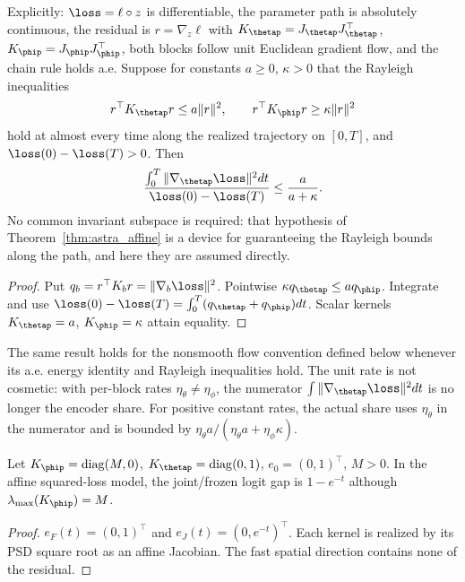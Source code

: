 \begin{corollary}
\label{cor:astra_attribution}
Explicitly: $\loss=\ell\circ z$ is differentiable, the parameter path
is absolutely continuous, the residual is $r=\nabla_z\ell$ with
$K_\thetap=J_\thetap J_\thetap^\top$,
$K_\phip=J_\phip J_\phip^\top$, both blocks follow unit Euclidean
gradient flow, and the chain rule holds a.e. Suppose for constants
$a\ge0$, $\kappa>0$ that the Rayleigh inequalities
\[
 r^\top K_\thetap r\le a\|r\|^2,\qquad
 r^\top K_\phip r\ge\kappa\|r\|^2
\]
hold at almost every time along the realized trajectory on $[0,T]$,
and $\loss(0)-\loss(T)>0$. Then
\begin{equation}\label{eq:astra_attribution}
 \frac{\int_0^T\|\nabla_\thetap\loss\|^2dt}{\loss(0)-\loss(T)}
 \le\frac{a}{a+\kappa}.
\end{equation}
No common invariant subspace is required: that hypothesis of
Theorem~\ref{thm:astra_affine} is a device for guaranteeing the
Rayleigh bounds along the path, and here they are assumed directly.
\end{corollary}
\begin{proof}
Put $q_b=r^\top K_b r=\|\nabla_b\loss\|^2$.
Pointwise $\kappa q_\thetap\le a q_\phip$. Integrate and use
$\loss(0)-\loss(T)=\int_0^T(q_\thetap+q_\phip)dt$.
Scalar kernels $K_\thetap=a$, $K_\phip=\kappa$ attain equality.
\end{proof}
\begin{remark}
The same result holds for the nonsmooth flow convention defined below
whenever its a.e. energy identity and Rayleigh inequalities hold.
The unit rate is not cosmetic: with per-block rates $\eta_\theta\ne
\eta_\phi$, the numerator $\int\|\nabla_\thetap\loss\|^2dt$ is no
longer the encoder share. For positive constant rates, the actual share
uses $\eta_\theta$ in the numerator and is bounded by
$\eta_\theta a/(\eta_\theta a+\eta_\phi\kappa)$.
\end{remark}

\begin{proposition}
\label{prop:astra_top_counter}
Let $K_\phip=\operatorname{diag}(M,0)$,
$K_\thetap=\operatorname{diag}(0,1)$, $e_0=(0,1)^\top$, $M>0$.
In the affine squared-loss model, the joint/frozen logit gap is
$1-e^{-t}$ although $\lambda_{\max}(K_\phip)=M$.
\end{proposition}
\begin{proof}
$e_F(t)=(0,1)^\top$ and $e_J(t)=(0,e^{-t})^\top$. Each kernel is
realized by its PSD square root as an affine Jacobian. The fast spatial
direction contains none of the residual.
\end{proof}

